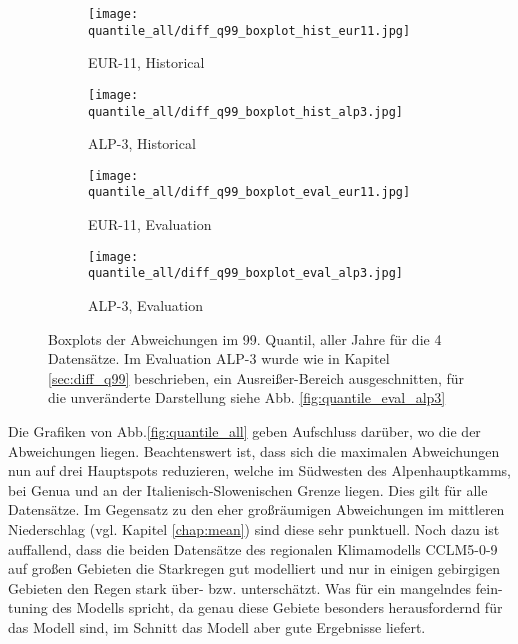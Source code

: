 \begin{figure}[h]
	\begin{subfigure}{0.49\textwidth}
		\texttt{[image: quantile\_all/diff\_q99\_boxplot\_hist\_eur11.jpg]}
		\caption{EUR-11, Historical}
	\end{subfigure}
	\begin{subfigure}{0.49\textwidth}
		\texttt{[image: quantile\_all/diff\_q99\_boxplot\_hist\_alp3.jpg]}
		\caption{ALP-3, Historical}
	\end{subfigure}
	\begin{subfigure}{0.49\textwidth}
		\texttt{[image: quantile\_all/diff\_q99\_boxplot\_eval\_eur11.jpg]}
		\caption{EUR-11, Evaluation}
	\end{subfigure}
	\begin{subfigure}{0.49\textwidth}
		\texttt{[image: quantile\_all/diff\_q99\_boxplot\_eval\_alp3.jpg]}
		\caption{ALP-3, Evaluation}
	\end{subfigure}
	\caption{Boxplots der Abweichungen im 99. Quantil, aller Jahre für die 4 Datensätze. Im Evaluation ALP-3 wurde wie in Kapitel \ref{sec:diff_q99} beschrieben, ein Ausreißer-Bereich ausgeschnitten, für die unveränderte Darstellung siehe Abb. \ref{fig:quantile_eval_alp3}}
	\label{fig:quantile_all_boxplots}
\end{figure}

Die Grafiken von Abb.\ref{fig:quantile_all} geben Aufschluss darüber, wo die der Abweichungen liegen. Beachtenswert ist, dass sich die maximalen Abweichungen nun auf drei Hauptspots reduzieren, welche im Südwesten des Alpenhauptkamms, bei Genua und an der Italienisch-Slowenischen Grenze liegen. Dies gilt für alle Datensätze. Im Gegensatz zu den eher großräumigen Abweichungen im mittleren Niederschlag (vgl. Kapitel \ref{chap:mean}) sind diese sehr punktuell. Noch dazu ist auffallend, dass die beiden Datensätze des regionalen Klimamodells CCLM5-0-9 auf großen Gebieten die Starkregen gut modelliert und nur in einigen gebirgigen Gebieten den Regen stark über- bzw. unterschätzt. Was für ein mangelndes fein-tuning des Modells spricht, da genau diese Gebiete besonders herausfordernd für das Modell sind, im Schnitt das Modell aber gute Ergebnisse liefert.\\


